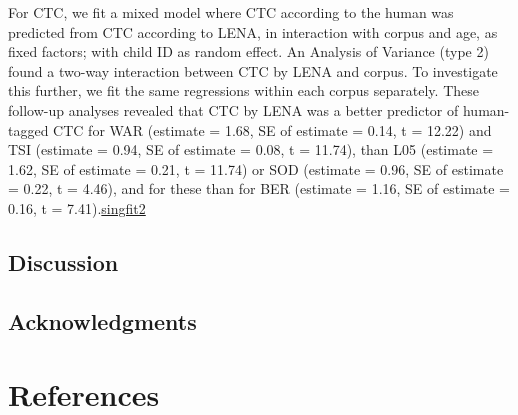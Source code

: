 \documentclass[english,floatsintext,man]{apa6}
\begin{document}
For CTC, we fit a mixed model where CTC according to the human was
predicted from CTC according to LENA, in interaction with corpus and
age, as fixed factors; with child ID as random effect. An Analysis of
Variance (type 2) found a two-way interaction between CTC by LENA and
corpus. To investigate this further, we fit the same regressions within
each corpus separately. These follow-up analyses revealed that CTC by
LENA was a better predictor of human-tagged CTC for WAR (estimate =
1.68, SE of estimate = 0.14, t = 12.22) and TSI (estimate = 0.94, SE of
estimate = 0.08, t = 11.74), than L05 (estimate = 1.62, SE of estimate =
0.21, t = 11.74) or SOD (estimate = 0.96, SE of estimate = 0.22, t =
4.46), and for these than for BER (estimate = 1.16, SE of estimate =
0.16, t =
7.41).\href{For\%20both\%20TSI\%20and\%20WAR,\%20the\%20variance\%20associated\%20to\%20the\%20child\%20ID\%20random\%20factor\%20was\%20zero.\%20This\%20suggests\%20a\%20mixed\%20model\%20was\%20not\%20necessary,\%20as\%20child\%20ID\%20is\%20not\%20explaining\%20any\%20additional\%20variance,\%20but\%20it\%20does\%20not\%20alter\%20the\%20interpretation\%20in\%20the\%20main\%20text.}{singfit2}

\subsection{Discussion}\label{discussion}

\subsection{Acknowledgments}\label{acknowledgments}

\newpage

\section{References}\label{references}

\setlength{\parindent}{-0.5in} \setlength{\leftskip}{0.5in}
\end{document}
